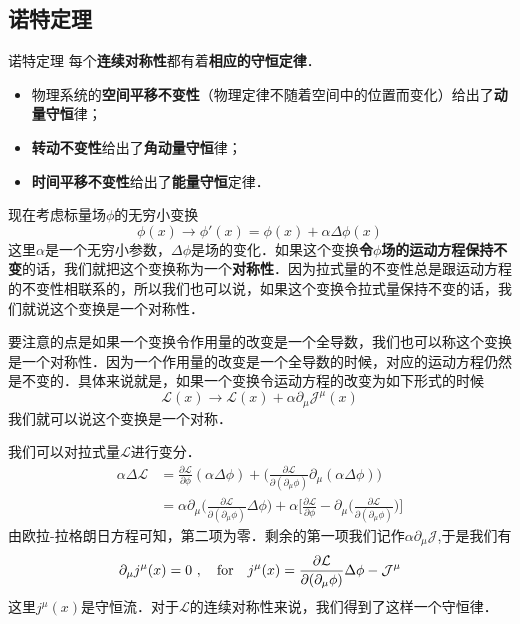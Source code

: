\subsection{诺特定理}
\begin{theorem}{诺特定理}
每个\textbf{连续对称性}都有着\textbf{相应的守恒定律}．
\begin{itemize}
\item 物理系统的\textbf{空间平移不变性}（物理定律不随着空间中的位置而变化）给出了\textbf{动量守恒}律；
\item \textbf{转动不变性}给出了\textbf{角动量守恒}律；
\item \textbf{时间平移不变性}给出了\textbf{能量守恒}定律．
\end{itemize}
\end{theorem}
现在考虑标量场$\phi$的无穷小变换
\begin{equation}
\phi(x) \rightarrow \phi'(x) = \phi(x) +\alpha \Delta \phi (x)
\end{equation}
这里$\alpha$是一个无穷小参数，$\Delta \phi$是场的变化．如果这个变换\textbf{令$\phi$场的运动方程保持不变}的话，我们就把这个变换称为一个\textbf{对称性}．因为拉式量的不变性总是跟运动方程的不变性相联系的，所以我们也可以说，如果这个变换令拉式量保持不变的话，我们就说这个变换是一个对称性．

要注意的点是如果一个变换令作用量的改变是一个全导数，我们也可以称这个变换是一个对称性．因为一个作用量的改变是一个全导数的时候，对应的运动方程仍然是不变的．具体来说就是，如果一个变换令运动方程的改变为如下形式的时候
\begin{equation}
\mathcal L(x) \rightarrow \mathcal L (x) +\alpha \partial_\mu \mathcal J^\mu (x)
\end{equation}
我们就可以说这个变换是一个对称．

我们可以对拉式量$\mathcal L$进行变分．
\begin{align}\nonumber
\alpha \Delta \mathcal L & = \frac{\partial \mathcal L}{\partial \phi} (\alpha \Delta \phi) + \bigg( \frac{\partial \mathcal L}{\partial(\partial_\mu \phi)} \partial_\mu(\alpha \Delta \phi)\bigg) \\
& = \alpha \partial_\mu \bigg( \frac{\partial \mathcal L}{\partial (\partial_\mu\phi)} \Delta \phi \bigg) + \alpha \bigg[ \frac{\partial \mathcal L}{\partial \phi} - \partial_\mu \bigg( \frac{\partial \mathcal L}{\partial(\partial_\mu \phi)} \bigg) \bigg]
\end{align}
由欧拉-拉格朗日方程可知，第二项为零．剩余的第一项我们记作$\alpha \partial_\mu \mathcal J$,于是我们有
\begin{equation}
\partial_\mu j^\mu(x) = 0~, \quad {\rm for}\quad j^\mu(x) = \frac{\partial \mathcal L}{\partial(\partial_\mu \phi)} \Delta \phi - \mathcal J^\mu
\end{equation}
这里$j^\mu(x)$是守恒流．对于$\mathcal L$的连续对称性来说，我们得到了这样一个守恒律．

